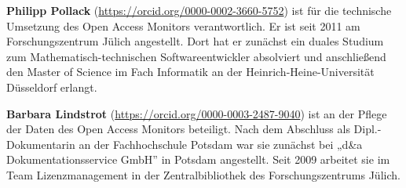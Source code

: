 \documentclass[a4paper,
fontsize=11pt,
oneside,
numbers=noperiodatend,
parskip=half-,
bibliography=totoc,
final
]{scrartcl}
\begin{document}
\textbf{Philipp Pollack} (\url{https://orcid.org/0000-0002-3660-5752}) ist für die technische Umsetzung des Open
Access Monitors verantwortlich. Er ist seit 2011 am Forschungszentrum
Jülich angestellt. Dort hat er zunächst ein duales Studium zum
Mathematisch-technischen Softwareentwickler absolviert und anschließend
den Master of Science im Fach Informatik an der
Heinrich-Heine-Universität Düsseldorf erlangt.

\textbf{Barbara Lindstrot} (\url{https://orcid.org/0000-0003-2487-9040}) ist an der Pflege der Daten des Open Access
Monitors beteiligt. Nach dem Abschluss als Dipl.-Dokumentarin an der
Fachhochschule Potsdam war sie zunächst bei „d\&a Dokumentationsservice
GmbH'' in Potsdam angestellt. Seit 2009 arbeitet sie im Team
Lizenzmanagement in der Zentralbibliothek des Forschungszentrums Jülich.
\end{document}
